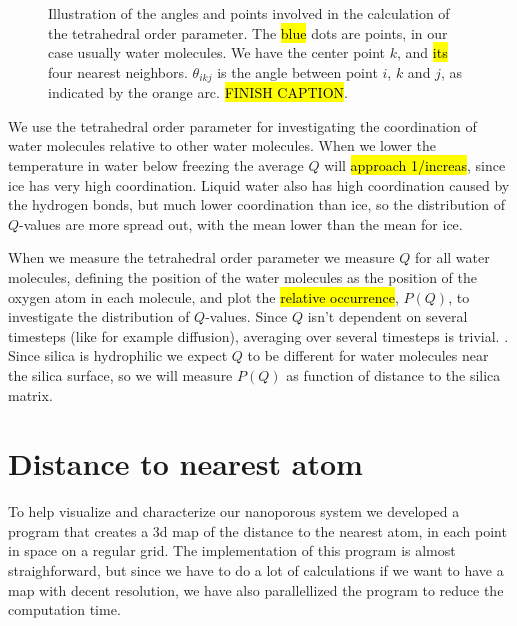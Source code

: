 %
\begin{figure}[htpb]%
    \centering%
    \caption{%
        Illustration of the angles and points involved in the calculation of the tetrahedral order parameter. The \hl{blue} dots are points, in our case usually water molecules. We have the center point $k$, and \hl{its} four nearest neighbors. $\theta_{ikj}$ is the angle between point $i$, $k$ and $j$, as indicated by the orange arc. \hl{FINISH CAPTION}. %
        \label{fig:top_tetrahedra}%
    }%
\end{figure}%

We use the tetrahedral order parameter for investigating the coordination of water molecules relative to other water molecules. When we lower the temperature in water below freezing the average $Q$ will \hl{approach 1/increas}, since ice has very high coordination. Liquid water also has high coordination caused by the hydrogen bonds, but much lower coordination than ice, so the distribution of $Q$-values are more spread out, with the mean lower than the mean for ice.

When we measure the tetrahedral order parameter we measure $Q$ for all water molecules, defining the position of the water molecules as the position of the oxygen atom in each molecule, and plot the \hl{relative occurrence}, $P(Q)$, to investigate the distribution of $Q$-values. Since $Q$ isn't dependent on several timesteps (like for example diffusion), averaging over several timesteps is trivial. . Since silica is hydrophilic we expect $Q$ to be different for water molecules near the silica surface, so we will measure $P(Q)$ as function of distance to the silica matrix.


\section{Distance to nearest atom\label{sec:distance_to_atom}}
To help visualize and characterize our nanoporous system we developed a program that creates a 3d map of the distance to the nearest atom, in each point in space on a regular grid. The implementation of this program is almost straighforward, but since we have to do a lot of calculations if we want to have a map with decent resolution, we have also parallellized the program to reduce the computation time.

